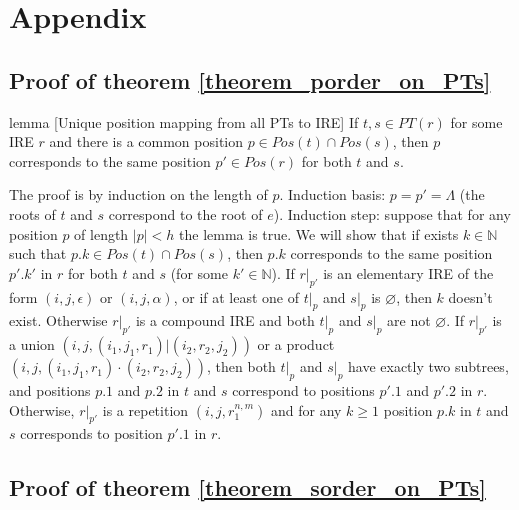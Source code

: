 \documentclass[AMA,STIX1COL]{WileyNJD-v2}
\newcommand{\YN}{\mathbb{N}}
\begin{document}
\vfill\null
\clearpage


\section*{Appendix}

\subsection*{Proof of theorem \ref{theorem_porder_on_PTs}}

\begin{theoremEnd}{lemma}
[Unique position mapping from all PTs to IRE]
    \label{lemma_positions}
    If $t, s \in PT(r)$ for some IRE $r$
    and there is a common position $p \in Pos(t) \cap Pos(s)$,
    then $p$ corresponds to the same position $p' \in Pos(r)$ for both $t$ and $s$.
\end{theoremEnd}
\begin{proofEnd}
    The proof is by induction on the length of $p$.
    Induction basis: $p = p' = \Lambda$ (the roots of $t$ and $s$ correspond to the root of $e$).
    Induction step: suppose that for any position $p$ of length $|p| < h$ the lemma is true.
    We will show that if exists $k \in \YN$ such that $p.k \in Pos(t) \cap Pos(s)$,
    then $p.k$ corresponds to the same position $p'.k'$ in $r$ for both $t$ and $s$ (for some $k' \in \YN$).
    If $r|_{p'}$ is an elementary IRE of the form $(i, j, \epsilon)$ or $(i, j, \alpha)$,
    or if at least one of $t|_p$ and $s|_p$ is $\varnothing$,
    then $k$ doesn't exist.
    Otherwise $r|_{p'}$ is a compound IRE and both $t|_p$ and $s|_p$ are not $\varnothing$.
    If $r|_{p'}$ is a union $(i, j, (i_1, j_1, r_1)|(i_2, r_2, j_2))$
    or a product $(i, j, (i_1, j_1, r_1)\cdot(i_2, r_2, j_2))$,
    then both $t|_p$ and $s|_p$ have exactly two subtrees,
    and positions $p.1$ and $p.2$ in $t$ and $s$ correspond to positions $p'.1$ and $p'.2$ in $r$.
    Otherwise, $r|_{p'}$ is a repetition $(i, j, r_1^{n,m})$
    and for any $k \geq 1$ position $p.k$ in $t$ and $s$ corresponds to position $p'.1$ in $r$.
\end{proofEnd}



\subsection*{Proof of theorem \ref{theorem_sorder_on_PTs}}
\end{document}
